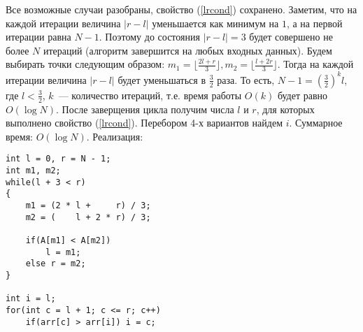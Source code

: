 \documentclass[a4paper]{article}
\begin{document}
\begin{enumerate}
Все возможные случаи разобраны, свойство (\ref{lrcond}) сохранено.\newline
Заметим, что на каждой итерации величина $|r-l|$ уменьшается как минимум на $1$, а на первой итерации равна $N-1$. Поэтому до состояния $|r-l|=3$ будет совершено не более $N$ итераций (алгоритм завершится на любых входных данных).\newline
Будем выбирать точки следующим образом: $m_1=\lfloor\frac{2l+r}{3}\rfloor,m_2=\lfloor\frac{l+2r}{3}\rfloor$. Тогда на каждой итерации величина $|r-l|$ будет уменьшаться в $\frac{3}{2}$ раза. То есть, $N-1=(\frac{3}{2})^k l$, где $l<\frac{3}{2}$, $k$~--- количество итераций, т.е. время работы $O(k)$ будет равно $O(\log N)$.\newline
После заверщения цикла получим числа $l$ и $r$, для которых выполнено свойство (\ref{lrcond}). Перебором 4-х вариантов найдем $i$.\newline
Суммарное время: $O(\log N)$.\newline
Реализация:\begin{verbatim}
int l = 0, r = N - 1;
int m1, m2;
while(l + 3 < r)
{
    m1 = (2 * l +     r) / 3;
    m2 = (    l + 2 * r) / 3;

    if(A[m1] < A[m2])
        l = m1;
    else r = m2;
}

int i = l;
for(int c = l + 1; c <= r; c++)
    if(arr[c] > arr[i]) i = c;\end{verbatim}
\end{enumerate}
\end{document}
